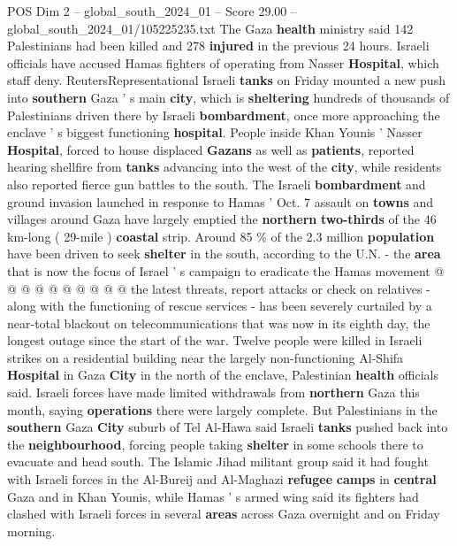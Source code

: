 \begin{textsample}{POS Dim 2 – global\_south\_2024\_01 – Score 29.00 – global\_south\_2024\_01/105225235.txt}  \label{ex:f2_pos_126}
The Gaza \textbf{health} ministry said 142 Palestinians had been killed and 278 \textbf{injured} in the previous 24 hours.
Israeli officials have accused Hamas fighters of operating from Nasser \textbf{Hospital}, which staff deny.
ReutersRepresentational Israeli \textbf{tanks} on Friday mounted a new push into \textbf{southern} Gaza ' s main \textbf{city}, which is \textbf{sheltering} hundreds of thousands of Palestinians driven there by Israeli \textbf{bombardment}, once more approaching the enclave ' s biggest functioning \textbf{hospital}.
People inside Khan Younis ' Nasser \textbf{Hospital}, forced to house displaced \textbf{Gazans} as well as \textbf{patients}, reported hearing shellfire from \textbf{tanks} advancing into the west of the \textbf{city}, while residents also reported fierce gun battles to the south.
The Israeli \textbf{bombardment} and ground invasion launched in response to Hamas ' Oct. 7 assault on \textbf{towns} and villages around Gaza have largely emptied the \textbf{northern} \textbf{two-thirds} of the 46 km-long ( 29-mile ) \textbf{coastal} strip.
Around 85 \% of the 2.3 million \textbf{population} have been driven to seek \textbf{shelter} in the south, according to the U.N. - the \textbf{area} that is now the focus of Israel ' s campaign to eradicate the Hamas movement @ @ @ @ @ @ @ @ @ @ the latest threats, report attacks or check on relatives - along with the functioning of rescue services - has been severely curtailed by a near-total blackout on telecommunications that was now in its eighth day, the longest outage since the start of the war.
Twelve people were killed in Israeli strikes on a residential building near the largely non-functioning Al-Shifa \textbf{Hospital} in Gaza \textbf{City} in the north of the enclave, Palestinian \textbf{health} officials said.
Israeli forces have made limited withdrawals from \textbf{northern} Gaza this month, saying \textbf{operations} there were largely complete.
But Palestinians in the \textbf{southern} Gaza \textbf{City} suburb of Tel Al-Hawa said Israeli \textbf{tanks} pushed back into the \textbf{neighbourhood}, forcing people taking \textbf{shelter} in some schools there to evacuate and head south.
The Islamic Jihad militant group said it had fought with Israeli forces in the Al-Bureij and Al-Maghazi \textbf{refugee} \textbf{camps} in \textbf{central} Gaza and in Khan Younis, while Hamas ' s armed wing said its fighters had clashed with Israeli forces in several \textbf{areas} across Gaza overnight and on Friday morning.

\end{textsample}
